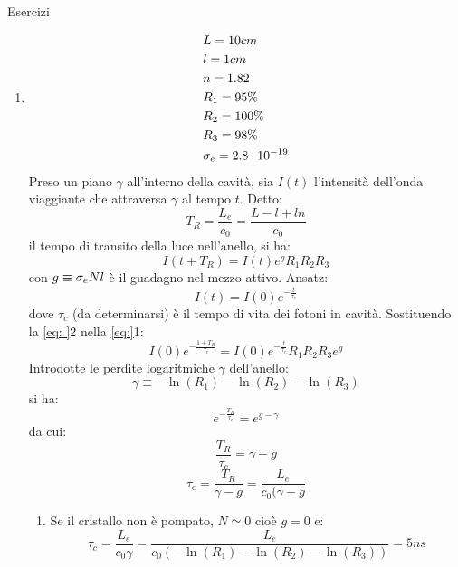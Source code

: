 Esercizi
\begin{enumerate}
\item \begin{align*}[l]
&L = 10 cm\\
&l = 1cm\\
&n = 1.82\\
&R_1 = 95\%\\
&R_2 = 100\%\\
&R_3 = 98\%\\
&\s_e = 2.8 \cdot 10^{-19}
\end{align*}
Preso un piano $\gamma$ all'interno della cavità, sia $I(t)$ l'intensità dell'onda viaggiante che attraversa $\gamma$ al tempo $t$. Detto:
\begin{equation*}
T_R = \frac{L_e}{c_0} = \frac{L - l + ln}{c_0}
\end{equation*}
il tempo di transito della luce nell'anello, si ha:
\begin{equation*}
I(t + T_R) = I(t) e^g R_1R_2R_3
\end{equation*}
con $g\equiv\sigma_eNl$ è il guadagno nel mezzo attivo.
Ansatz:
\begin{equation*}
I(t) = I(0) e^{-\frac{t}{\tau_c}}
\end{equation*}
dove $\tau_c$ (da determinarsi) è il tempo di vita dei fotoni in cavità.
Sostituendo la \eqref{eq: }2 nella \eqref{eq:}1:
\begin{equation*}
I(0) e^{-\frac{1+T_R}{\tau_c}} = I(0) e^{-\frac{t}{\tau_c}} R_1R_2R_3 e^g
\end{equation*}
Introdotte le perdite logaritmiche $\gamma$ dell'anello:
\begin{equation*}
\gamma \equiv -\ln(R_1) -\ln(R_2) -\ln(R_3)
\end{equation*}
si ha:
\begin{equation*}
e^{-\frac{T_R}{\tau_c}} = e^{g-\gamma}
\end{equation*}
da cui:
\begin{equation*}
\frac{T_R}{\tau_c} = \gamma - g
\end{equation*}
\begin{equation*}
\tau_c = \frac{T_R}{\gamma - g} = \frac{L_e}{c_0(\gamma - g}
\end{equation*}
\begin{enumerate}
\item Se il cristallo non è pompato, $N\simeq 0$ cioè $g=0$ e:
\begin{equation*}
\tau_c = \frac{L_e}{c_0 \gamma} = \frac{L_e}{c_0 (-\ln(R_1) -\ln(R_2) -\ln(R_3))} = 5 ns
\end{equation*}

\end{enumerate}
\end{enumerate}

